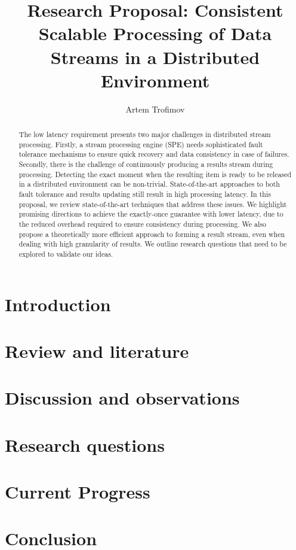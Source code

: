\documentclass[runningheads]{llncs}
\begin{document}
\title {Research Proposal: Consistent Scalable Processing of Data Streams in  a Distributed Environment
}
\author{Artem Trofimov}

\maketitle

\begin{abstract}
The low latency requirement presents two major challenges in distributed stream processing. Firstly, a stream processing engine (SPE) needs sophisticated fault tolerance mechanisms to ensure quick recovery and data consistency in case of failures. Secondly, there is the challenge of continuously producing a results stream during processing. Detecting the exact moment when the resulting item is ready to be released in a distributed environment can be non-trivial. State-of-the-art approaches to both fault tolerance and results updating still result in high processing latency.
In this proposal, we review state-of-the-art techniques that address these issues. We highlight promising directions to achieve the exactly-once guarantee with lower latency, due to the reduced overhead required to ensure consistency during processing. We also propose a theoretically more efficient approach to forming a result stream, even when dealing with high granularity of results. We outline research questions that need to be explored to validate our ideas.
\end{abstract}

\section {Introduction}


\section {Review and literature}


\section {Discussion and observations}


\section {Research questions}


\section {Current Progress}


\section {Conclusion}




\end{document}
